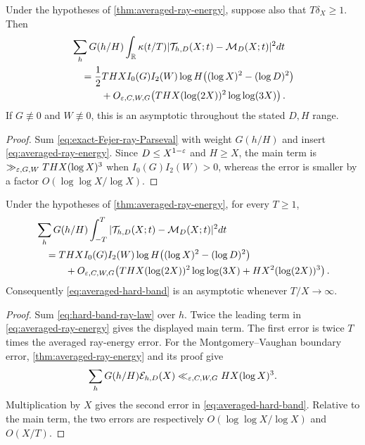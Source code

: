 \begin{corollary}
\label{cor:averaged-Fejer-band}
Under the hypotheses of \cref{thm:averaged-ray-energy}, suppose also that
$T\delta_X\geq1$.  Then
\begin{equation}
 \begin{aligned}
 &\sum_hG(h/H)
 \int_\mathbb R\kappa(t/T)|\mathcal T_{h,D}(X;t)-\mathcal M_D(X;t)|^2dt\\
 &\quad=\frac12THX I_0(G)I_2(W)\log H
 \bigl((\log X)^2-(\log D)^2\bigr)\\
 &\qquad\quad+O_{\varepsilon,C,W,G}\!\left(
 THX(\log(2X))^2\log\log(3X)\right).
 \end{aligned}
 \label{eq:averaged-Fejer-band}
\end{equation}
If $G\not\equiv0$ and $W\not\equiv0$, this is an asymptotic throughout
the stated $D,H$ range.
\end{corollary}

\begin{proof}
Sum \eqref{eq:exact-Fejer-ray-Parseval} with weight $G(h/H)$ and insert
\eqref{eq:averaged-ray-energy}.  Since
$D\leq X^{1-\varepsilon}$ and $H\geq X$, the main term is
$\gg_{\varepsilon,G,W}THX(\log X)^3$ when $I_0(G)I_2(W)>0$, whereas the error is
smaller by a factor $O(\log\log X/\log X)$.
\end{proof}

\begin{corollary}
\label{cor:averaged-hard-band}
Under the hypotheses of \cref{thm:averaged-ray-energy}, for every
$T\geq1$,
\begin{equation}
 \begin{aligned}
 &\sum_hG(h/H)
 \int_{-T}^{T}|\mathcal T_{h,D}(X;t)-\mathcal M_D(X;t)|^2dt\\
 &\quad=THX I_0(G)I_2(W)\log H
 \bigl((\log X)^2-(\log D)^2\bigr)\\
 &\qquad\quad+O_{\varepsilon,C,W,G}\!\left(
 THX(\log(2X))^2\log\log(3X)
 +HX^2(\log(2X))^3\right).
 \end{aligned}
 \label{eq:averaged-hard-band}
\end{equation}
Consequently \eqref{eq:averaged-hard-band} is an asymptotic whenever
$T/X\to\infty$.
\end{corollary}

\begin{proof}
Sum \eqref{eq:hard-band-ray-law} over $h$.  Twice the leading term in
\eqref{eq:averaged-ray-energy} gives the displayed main term.  The first
error is twice $T$ times the averaged ray-energy error.  For the
Montgomery--Vaughan boundary error, \cref{thm:averaged-ray-energy} and its
proof give
\[
 \sum_hG(h/H)\mathcal E_{h,D}(X)\ll_{\varepsilon,C,W,G}HX(\log X)^3.
\]
Multiplication by $X$ gives the second error in
\eqref{eq:averaged-hard-band}.  Relative to the main term, the two errors
are respectively $O(\log\log X/\log X)$ and $O(X/T)$.
\end{proof}


